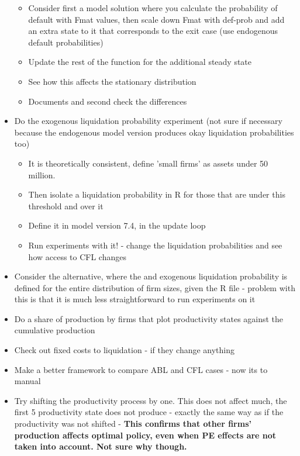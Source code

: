 \documentclass[12pt]{article}
\begin{document}
\begin{itemize}
\begin{itemize}
        \item Consider first a model solution where you calculate the probability of default with Fmat values, then scale down Fmat with def-prob and add an extra state to it that corresponds to the exit case (use endogenous default probabilities)  \checkmark
        \item Update the rest of the function for the additional steady state  \checkmark
        \item See how this affects the stationary distribution \checkmark
        \item Documents and second check the differences  \checkmark
    \end{itemize}
    \item Do the exogenous liquidation probability experiment (not sure if necessary because the endogenous model version produces okay liquidation probabilities too) \checkmark
        \begin{itemize}
            \item It is theoretically consistent, define 'small firms' as assets under 50 million. \checkmark
            \item Then isolate a liquidation probability in R for those that are under this threshold and over it  \checkmark
            \item Define it in model version 7.4, in the update loop \checkmark
            \item Run experiments with it! - change the liquidation probabilities and see how access to CFL changes \checkmark
        \end{itemize}
    \item Consider the alternative, where the and exogenous liquidation probability is defined for the entire distribution of firm sizes, given the R file - problem with this is that it is much less straightforward to run experiments on it \checkmark
    \item Do a share of production by firms that plot productivity states against the cumulative production \checkmark
    \item Check out fixed costs to liquidation - if they change anything \checkmark
    \item Make a better framework to compare ABL and CFL cases - now its to manual  \checkmark
    \item Try shifting the productivity process by one. This does not affect much, the first 5 productivity state does not produce - exactly the same way as if the productivity was not shifted - \textbf{This confirms that other firms' production affects optimal policy, even when PE effects are not taken into account. Not sure why though.} \checkmark

\end{itemize}
\end{document}
